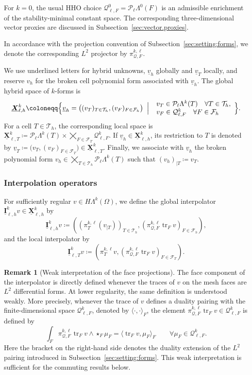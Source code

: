 \documentclass[a4paper,11pt]{article}
\theoremstyle{definition}
\newtheorem{remark}[theorem]{Remark}
\newcommand{\PL}[2]{\mathcal{P}_{#1}\Lambda^{#2}}
\newcommand{\uX}[2]{\underline{\boldsymbol{X}}_{\ell,#2}^{#1}}
\newcommand{\uI}[2]{\underline{\boldsymbol{I}}_{\ell,#2}^{#1}}
\newcommand{\uXh}[1]{\underline{\boldsymbol{X}}_{\ell,h}^{#1}}
\newcommand{\Qtrace}[2]{\mathcal Q_{\ell,#1}^{#2}}
\newcommand{\piQ}[2]{\pi_{\mathcal Q,#1}^{#2,\ell}}
\newcommand{\trc}{\operatorname{tr}}
\begin{document}
For $k=0$, the usual HHO choice $\Qtrace{F}{0}=\PL{\ell}{0}(F)$ is an admissible enrichment of the stability-minimal constant space.
The corresponding three-dimensional vector proxies are discussed in Subsection~\ref{sec:vector.proxies}.

In accordance with the projection convention of Subsection~\ref{sec:setting:forms}, we denote the corresponding $L^2$ projector by $\piQ{F}{k}$.

We use underlined letters for hybrid unknowns, $\underline v_h$ globally and $\underline v_T$ locally, and reserve $v_h$ for the broken cell polynomial form associated with $\underline v_h$.
The global hybrid space of $k$-forms is
\[
  \uXh{k}
  \coloneqq
  \Bigl\{
    \underline v_h
    =
    \bigl(
      (v_T)_{T\in\mathcal T_h},
      (v_F)_{F\in\mathcal F_h}
    \bigr)
    \;\Bigm|\;
    \begin{array}{l}
      v_T\in\PL{\ell}{k}(T)
      \quad\forall T\in\mathcal T_h,
      \\
      v_F\in\Qtrace{F}{k}
      \quad\forall F\in\mathcal F_h
    \end{array}
  \Bigr\}.
\]
For a cell $T\in\mathcal T_h$, the corresponding local space is $\uX{k}{T} \coloneqq \PL{\ell}{k}(T) \times \bigtimes_{F\in\mathcal F_T} \Qtrace{F}{k}$.
If $\underline v_h\in\uXh{k}$, its restriction to $T$ is denoted by $\underline v_T\coloneqq\bigl(v_T,(v_F)_{F\in\mathcal F_T}\bigr)\in\uX{k}{T}$.
Finally, we associate with $\underline v_h$ the broken polynomial form $v_h \in \bigtimes_{T\in\mathcal T_h} \PL{\ell}{k}(T)$ such that $(v_h)_{|T} \coloneqq v_T$.

\subsubsection{Interpolation operators}
\label{subsec:hybrid.reduction.forms}

For sufficiently regular $v\in H\Lambda^k(\Omega)$, we define the global interpolator $\uI{k}{h}v\in\uXh{k}$ by
\[
  \uI{k}{h}v
  \coloneqq
  \left(
    (\pi_T^{k,\ell}(v_{|T}))_{T\in\mathcal T_h},
    (\piQ{F}{k}\trc_Fv)_{F\in\mathcal F_h}
  \right),
\]
and the local interpolator by
\[
  \uI{k}{T}v
  \coloneqq
  \left(
    \pi_T^{k,\ell}v,
    (\piQ{F}{k}\trc_Fv)_{F\in\mathcal F_T}
  \right).
\]

\begin{remark}[Weak interpretation of the face projections]
\label{rem:regularity.interpolator.forms}
The face component of the interpolator is directly defined whenever the traces of $v$ on the mesh faces are $L^2$ differential forms.
At lower regularity, the same definition is understood weakly.
More precisely, whenever the trace of $v$ defines a duality pairing with the finite-dimensional space $\Qtrace{F}{k}$, denoted by $\langle\cdot,\cdot\rangle_F$, the element $\piQ{F}{k}\trc_Fv\in\Qtrace{F}{k}$ is defined by
\[
  \int_F
  \piQ{F}{k}\trc_Fv
  \wedge
  \star_F\mu_F
  =
  \langle\trc_Fv,\mu_F\rangle_F
  \qquad
  \forall\mu_F\in\Qtrace{F}{k}.
\]
Here the bracket on the right-hand side denotes the duality extension of the $L^2$ pairing introduced in Subsection~\ref{sec:setting:forms}.
This weak interpretation is sufficient for the commuting results below.
\end{remark}
\end{document}
